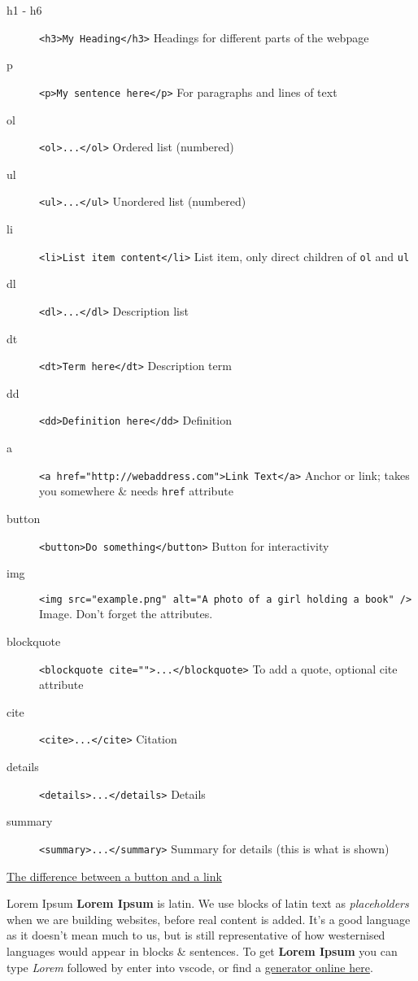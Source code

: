 \begin{description}
    \item[h1 - h6] \texttt{<h3>My Heading</h3>} Headings for different parts of the webpage
    \item[p] \texttt{<p>My sentence here</p>} For paragraphs and lines of text
    \item[ol] \texttt{<ol>...</ol>} Ordered list (numbered)
    \item[ul] \texttt{<ul>...</ul>} Unordered list (numbered)
    \item[li] \texttt{<li>List item content</li>} List item, only direct children of \texttt{ol} and \texttt{ul}
    \item[dl] \texttt{<dl>...</dl>} Description list
    \item[dt] \texttt{<dt>Term here</dt>} Description term
    \item[dd] \texttt{<dd>Definition here</dd>} Definition
    \item[a] \texttt{<a href="http://webaddress.com">Link Text</a>} Anchor or link; takes you somewhere \& needs \texttt{href} attribute
    \item[button] \texttt{<button>Do something</button>} Button for interactivity
    \item[img] \texttt{<img src="example.png" alt="A photo of a girl holding a book" />} Image. Don't forget the attributes.
    \item[blockquote] \texttt{<blockquote cite="">...</blockquote>} To add a quote, optional cite attribute
    \item[cite] \texttt{<cite>...</cite>} Citation
    \item[details] \texttt{<details>...</details>} Details
    \item[summary] \texttt{<summary>...</summary>} Summary for details (this is what is shown)
\end{description}

\href{https://css-tricks.com/a-complete-guide-to-links-and-buttons/}{The difference between a button and a link}

\begin{infobox}{Lorem Ipsum}
    \textbf{Lorem Ipsum} is latin. We use blocks of latin text as \textit{placeholders} when we are building websites, before real content is added. It's a good language as it doesn't mean much to us, but is still representative of how westernised languages would appear in blocks \& sentences.
    To get \textbf{Lorem Ipsum} you can type \textit{Lorem} followed by enter into vscode, or find a \href{https://www.lipsum.com/}{generator online here}.
\end{infobox}

